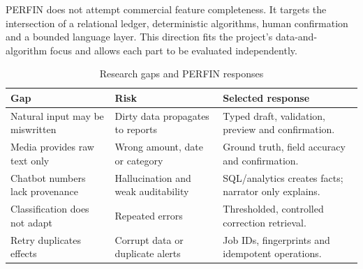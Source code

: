 PERFIN does not attempt commercial feature completeness. It targets the intersection of a relational ledger, deterministic algorithms, human confirmation and a bounded language layer. This direction fits the project's data-and-algorithm focus and allows each part to be evaluated independently.

\begin{table}[H]
  \centering
  \caption{Research gaps and PERFIN responses}
  \label{tab:research-gaps}
  \begin{tabularx}{\textwidth}{@{}Y Y Y@{}}
    \toprule
    \textbf{Gap} & \textbf{Risk} & \textbf{Selected response} \\
    \midrule
    Natural input may be miswritten & Dirty data propagates to reports & Typed draft, validation, preview and confirmation. \\
    Media provides raw text only & Wrong amount, date or category & Ground truth, field accuracy and confirmation. \\
    Chatbot numbers lack provenance & Hallucination and weak auditability & SQL/analytics creates facts; narrator only explains. \\
    Classification does not adapt & Repeated errors & Thresholded, controlled correction retrieval. \\
    Retry duplicates effects & Corrupt data or duplicate alerts & Job IDs, fingerprints and idempotent operations. \\
    \bottomrule
  \end{tabularx}
\end{table}
